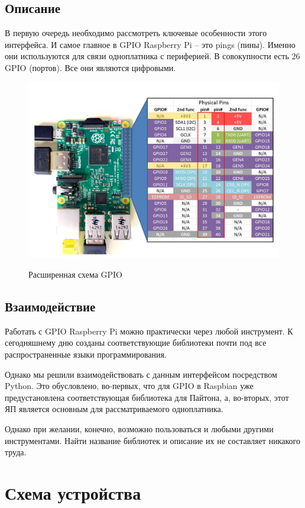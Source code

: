 \documentclass[a4paper, 14pt]{article}
\begin{document}
\subsection{Описание}

В первую очередь необходимо рассмотреть ключевые особенности этого интерфейса. И самое главное в GPIO Raspberry Pi – это pings (пины). Именно они используются для связи одноплатника с периферией.
В совокупности есть 26 GPIO (портов). Все они являются цифровыми.

\begin{figure}[H]
	\centering
	\includegraphics[width=12cm]{screenshots/999.png}\\
	\caption{Расширенная схема GPIO}
\end{figure}

\subsection{Взаимодействие}

Работать с GPIO Raspberry Pi можно практически через любой инструмент. К сегодняшнему дню созданы соответствующие библиотеки почти под все распространенные языки программирования.

Однако мы решили взаимодействовать с данным интерфейсом посредством Python. Это обусловлено, во-первых, что для GPIO в Raspbian уже предустановлена соответствующая библиотека для Пайтона, а, во-вторых, этот ЯП является основным для рассматриваемого одноплатника.

Однако при желании, конечно, возможно пользоваться и любыми другими инструментами. Найти название библиотек и описание их не составляет никакого труда.

\newpage
\section{Схема устройства}
\end{document}
